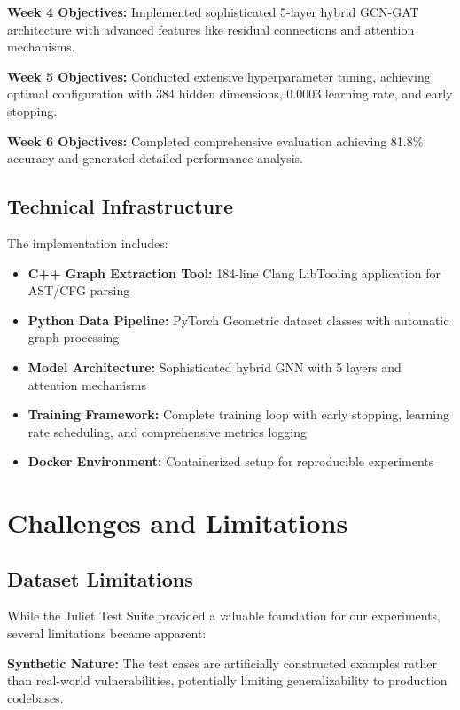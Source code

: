 \textbf{Week 4 Objectives:}  Implemented sophisticated 5-layer hybrid GCN-GAT architecture with advanced features like residual connections and attention mechanisms.

\textbf{Week 5 Objectives:}  Conducted extensive hyperparameter tuning, achieving optimal configuration with 384 hidden dimensions, 0.0003 learning rate, and early stopping.

\textbf{Week 6 Objectives:}  Completed comprehensive evaluation achieving 81.8\% accuracy and generated detailed performance analysis.

\subsection{Technical Infrastructure}

The implementation includes:
\begin{itemize}
\item \textbf{C++ Graph Extraction Tool:} 184-line Clang LibTooling application for AST/CFG parsing
\item \textbf{Python Data Pipeline:} PyTorch Geometric dataset classes with automatic graph processing  
\item \textbf{Model Architecture:} Sophisticated hybrid GNN with 5 layers and attention mechanisms
\item \textbf{Training Framework:} Complete training loop with early stopping, learning rate scheduling, and comprehensive metrics logging
\item \textbf{Docker Environment:} Containerized setup for reproducible experiments
\end{itemize}

\section{Challenges and Limitations}

\subsection{Dataset Limitations}

While the Juliet Test Suite provided a valuable foundation for our experiments, several limitations became apparent:

\textbf{Synthetic Nature:} The test cases are artificially constructed examples rather than real-world vulnerabilities, potentially limiting generalizability to production codebases.

